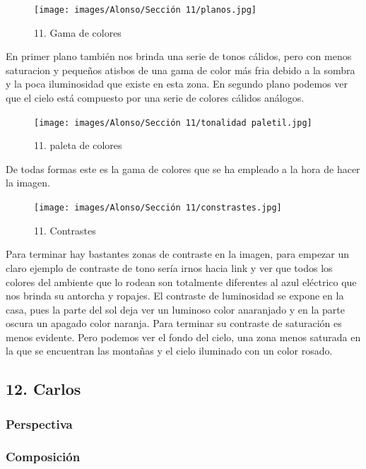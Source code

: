 \documentclass[12pt]{article}
\begin{document}
        \begin{figure}[H]
      \centering
      \texttt{[image: images/Alonso/Sección 11/planos.jpg]}
      \caption{\small 11. Gama de colores}
    \end{figure}
    En primer plano también nos brinda una serie de tonos cálidos, pero con menos saturacion y pequeños atisbos de una gama de color más fria debido a la sombra y la poca iluminosidad que existe en esta zona. En segundo plano  podemos ver que el cielo está compuesto por una serie de colores cálidos análogos.

    \begin{figure}[H]
      \centering
      \texttt{[image: images/Alonso/Sección 11/tonalidad paletil.jpg]}
      \caption{\small 11. paleta de colores}
    \end{figure}

    De todas formas este es la gama de colores que se ha empleado a la hora de hacer la imagen.

\begin{figure}[H]
      \centering
      \texttt{[image: images/Alonso/Sección 11/constrastes.jpg]}
      \caption{\small 11. Contrastes}
    \end{figure}
    Para terminar hay bastantes zonas de contraste en la imagen, para empezar un claro ejemplo de contraste de tono sería irnos hacia link y ver que todos los colores del ambiente que lo rodean son totalmente diferentes al azul eléctrico que nos brinda su antorcha y ropajes. El contraste de luminosidad se expone en la casa, pues la parte del sol deja ver un luminoso color anaranjado y en la parte oscura un apagado color naranja. Para terminar su contraste de saturación es menos evidente. Pero podemos ver el fondo del cielo, una zona menos saturada en la que se encuentran las montañas y el cielo iluminado con un color rosado.
        \newpage


    \subsection{12. Carlos}
        \subsubsection{Perspectiva}

        \subsubsection{Composición}
\end{document}
